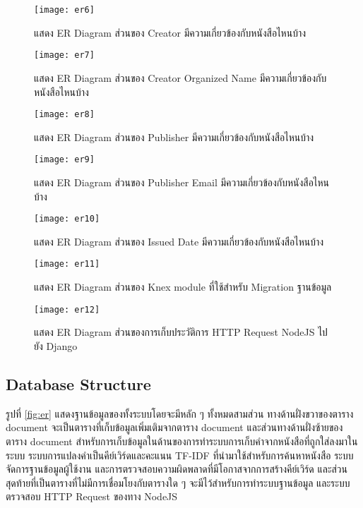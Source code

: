 \begin{figure}[H]
    \centering
    \texttt{[image: er6]}
    \caption{แสดง ER Diagram ส่วนของ Creator มีความเกี่ยวข้องกับหนังสือไหนบ้าง}\label{fig:er6}
\end{figure}



\begin{figure}[H]
    \centering
    \texttt{[image: er7]}
    \caption{แสดง ER Diagram ส่วนของ Creator Organized Name มีความเกี่ยวข้องกับหนังสือไหนบ้าง}\label{fig:er7}
\end{figure}



\begin{figure}[H]
    \centering
    \texttt{[image: er8]}
    \caption{แสดง ER Diagram ส่วนของ Publisher มีความเกี่ยวข้องกับหนังสือไหนบ้าง}\label{fig:er8}
\end{figure}



\begin{figure}[H]
    \centering
    \texttt{[image: er9]}
    \caption{แสดง ER Diagram ส่วนของ Publisher Email มีความเกี่ยวข้องกับหนังสือไหนบ้าง}\label{fig:er9}
\end{figure}



\begin{figure}[H]
    \centering
    \texttt{[image: er10]}
    \caption{แสดง ER Diagram ส่วนของ Issued Date มีความเกี่ยวข้องกับหนังสือไหนบ้าง}\label{fig:er10}
\end{figure}



\begin{figure}[H]
    \centering
    \texttt{[image: er11]}
    \caption{แสดง ER Diagram ส่วนของ Knex module ที่ใช้สำหรับ Migration ฐานข้อมูล}\label{fig:er11}
\end{figure}



\begin{figure}[H]
    \centering
    \texttt{[image: er12]}
    \caption{แสดง ER Diagram ส่วนของการเก็บประวัติการ HTTP Request NodeJS ไปยัง Django}\label{fig:er12}
\end{figure}

\subsection{Database Structure}
รูปที่ \ref{fig:er} แสดงฐานข้อมูลของทั้งระบบโดยจะมีหลัก ๆ ทั้งหมดสามส่วน ทางด้านฝั่งขวาของตาราง document จะเป็นตารางที่เก็บข้อมูลเพิ่มเติมจากตาราง document และส่วนทางด้านฝั่งซ้ายของตาราง document สำหรับการเก็บข้อมูลในด้านของการทำระบบการเก็บคำจากหนังสือที่ถูกใส่ลงมาในระบบ ระบบการแปลงคำเป็นคีย์เวิร์ดและคะแนน TF-IDF ที่นำมาใช้สำหรับการค้นหาหนังสือ ระบบจัดการฐานข้อมูลผู้ใช้งาน และการตรวจสอบความผิดพลาดที่มีโอกาสจากการสร้างคีย์เวิร์ด และส่วนสุดท้ายที่เป็นตารางที่ไม่มีการเชื่อมโยงกับตารางใด ๆ จะมีไว้สำหรับการทำระบบฐานข้อมูล และระบบตรวจสอบ HTTP Request ของทาง NodeJS

